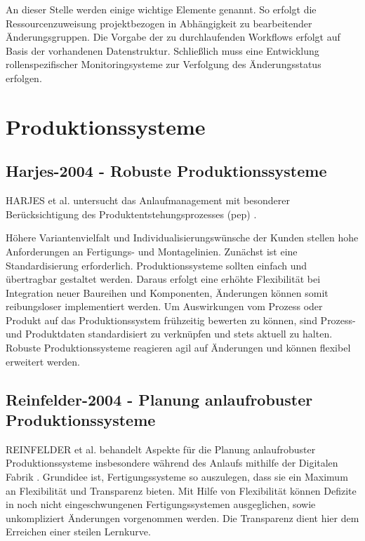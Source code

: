 An dieser Stelle werden einige wichtige Elemente genannt. So erfolgt die Ressourcenzuweisung projektbezogen in Abhängigkeit zu bearbeitender Änderungsgruppen. Die Vorgabe der zu durchlaufenden Workflows erfolgt auf Basis der vorhandenen Datenstruktur. Schließlich muss eine Entwicklung rollenspezifischer Monitoringsysteme zur Verfolgung des Änderungsstatus erfolgen. 

% 
% 
% 
\section{Produktionssysteme}

\subsection*{Harjes-2004 - Robuste Produktionssysteme}
HARJES et al. untersucht das Anlaufmanagement mit besonderer Berücksichtigung des Produktentstehungsprozesses (\gls{pep}) \autocite{Harjes2004}. 

Höhere Variantenvielfalt und Individualisierungswünsche der Kunden stellen hohe Anforderungen an Fertigungs- und Montagelinien. Zunächst ist eine Standardisierung erforderlich. Produktionssysteme sollten einfach und übertragbar gestaltet werden. Daraus erfolgt eine erhöhte Flexibilität bei Integration neuer Baureihen und Komponenten, Änderungen können somit reibungsloser implementiert werden. Um Auswirkungen vom Prozess oder Produkt auf das Produktionssystem frühzeitig bewerten zu können, sind Prozess- und Produktdaten standardisiert zu verknüpfen und stets aktuell zu halten. 
% 
Robuste Produktionssysteme reagieren agil auf Änderungen und können flexibel erweitert werden. 

\subsection*{Reinfelder-2004 - Planung anlaufrobuster Produktionssysteme}

REINFELDER et al. behandelt Aspekte für die Planung anlaufrobuster Produktionssysteme insbesondere während des Anlaufs mithilfe der Digitalen Fabrik %
\autocite{Reinfelder2004}. 
Grundidee ist, Fertigungssysteme so auszulegen, dass sie ein Maximum an Flexibilität und Transparenz bieten. Mit Hilfe von Flexibilität können Defizite in noch nicht eingeschwungenen Fertigungssystemen ausgeglichen, sowie unkompliziert Änderungen vorgenommen werden. Die Transparenz dient hier dem Erreichen einer steilen Lernkurve. 

